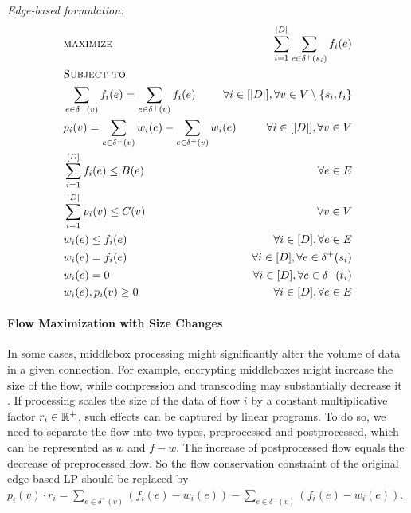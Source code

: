   \begin{minipage}[t]{0.45\textwidth}
\textit{Edge-based formulation:}
\small
  \begin{subequations}
\begin{align*}
&\textsc{maximize }&\sum\limits_{i=1}^{|D|}\sum \limits_{e\in \delta^+(s_i)} f_i(e)  \\ 
&\textsc{Subject to}\\%
&\sum\limits_{e \in \delta^-(v)}  f_i(e)=  \sum\limits_{e \in \delta^+(v)} f_i(e)& \forall i \in [|D|], \forall v \in V \setminus \{s_i,t_i\}\\
&p_i(v) = \sum\limits_{e \in \delta^-(v)} w_i(e) - \sum\limits_{e \in \delta^+(v)} w_i(e)  \hspace{-.3in}&\forall i \in [|D|],\forall v \in V\\
&\sum\limits_{i=1}^{[D]} f_i(e)\leq B(e)&\forall e \in E\\
&\sum\limits_{i=1}^{|D|} p_i(v) \leq C(v)&\forall v \in V\\
&w_i(e) \leq f_i(e)  &\forall i \in [D], \forall e \in E \\
&w_i (e)= f_i (e)&\forall i \in [D],\forall e \in \delta^+(s_i) \\
&w_i (e)= 0&\forall i \in [D], \forall e \in \delta^-(t_i) \\
&w_i (e), p_i (v) \geq 0&\forall i \in [D],\forall e \in E 
\end{align*}
\end{subequations}
\normalsize
\end{minipage}

\paragraph{Flow Maximization with Size Changes}
In some cases, middlebox processing might significantly alter the volume of data in a given connection. For example, encrypting middleboxes might increase the size of the flow, while compression and transcoding may substantially decrease it \cite{CDL99}. If processing scales the size of the data of flow $i$ by a constant multiplicative factor $r_i \in \mathbb{R}^+$, such effects can be captured by linear programs. To do so, we need to separate the flow into two types, preprocessed and postprocessed, which can be represented as $w$ and $f-w$. The increase of postprocessed flow equals the decrease of preprocessed flow. So the flow conservation constraint of the original edge-based LP should be replaced by $ p_i(v) \cdot r_i = \sum_{e \in \delta^+(v)} (f_i(e) - w_i(e)) - \sum_{e \in \delta^-(v)} (f_i(e) - w_i(e))$. 

